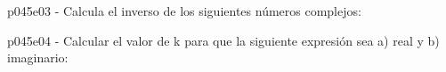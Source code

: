 \documentclass[spanish, 11pt]{exam}
\begin{document}
\begin{questions}
\begin{multicols}{2}
\begin{parts}
        \end{parts}
        \end{multicols}
        \question p045e03 - Calcula el inverso de los siguientes números complejos:
        \begin{multicols}{2} 
        \end{multicols}
        \question p045e04 - Calcular el valor de k para que la siguiente expresión sea a) real y b) imaginario:
        \begin{multicols}{2} 
        \end{multicols}
        
    \end{questions}
    
\end{document}
